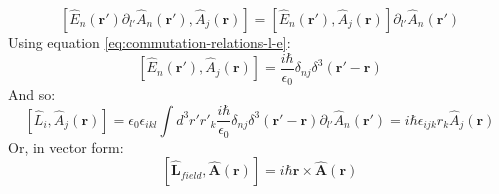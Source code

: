 \documentclass{article}
\begin{document}
\begin{equation}
    \left[\hat{E}_n(\boldsymbol{r'}) \partial_{l'}\hat{A}_n(\boldsymbol{r'}), \hat{A}_j(\boldsymbol{r})\right] = 
    \left[\hat{E}_n(\boldsymbol{r'}), \hat{A}_j(\boldsymbol{r})\right]\partial_{l'}\hat{A}_n(\boldsymbol{r'})
\end{equation}
Using equation \ref{eq:commutation-relations-l-e}:
\begin{equation}
    \left[\hat{E}_n(\boldsymbol{r'}), \hat{A}_j(\boldsymbol{r})\right] = \frac{i\hbar}{\epsilon_0}\delta_{nj}\delta^3(\boldsymbol{r'} - \boldsymbol{r})
\end{equation}
And so:
\begin{equation}
    \left[\hat{L}_{i}, \hat{A}_j(\boldsymbol{r})\right] = \epsilon_0 \epsilon_{ikl} \int d^3 r' r'_k \frac{i\hbar}{\epsilon_0}\delta_{nj}\delta^3(\boldsymbol{r'} - \boldsymbol{r})\partial_{l'}\hat{A}_n(\boldsymbol{r'}) = i\hbar \epsilon_{ijk} r_k\hat{A}_j(\boldsymbol{r})
\end{equation}
Or, in vector form:
\begin{equation}
    \left[\hat{\boldsymbol{L}}_{field}, \hat{\boldsymbol{A}}(\boldsymbol{r})\right] = i\hbar \boldsymbol{r} \times \hat{\boldsymbol{A}}(\boldsymbol{r})
\end{equation}
\end{document}
